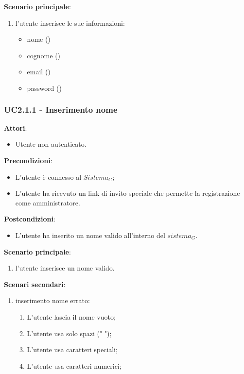 \textbf{Scenario principale}:
\begin{enumerate}
    \item l'utente inserisce le sue informazioni:
    \begin{itemize}
        \item nome ()
        \item cognome ()
        \item email ()
        \item password ()
    \end{itemize}
\end{enumerate}

\subsubsection{UC2.1.1 - Inserimento nome}\label{usecase:2_1_1}
\textbf{Attori}:
\begin{itemize}
    \item Utente non autenticato.
\end{itemize}
\textbf{Precondizioni}:
\begin{itemize}
   \item L'utente è connesso al $\textit{Sistema}_G$;
    \item L'utente ha ricevuto un link di invito speciale che permette la registrazione come amministratore.
\end{itemize}
\textbf{Postcondizioni}:
\begin{itemize}
    \item L'utente ha inserito un nome valido all'interno del $\textit{sistema}_G$.
\end{itemize}
\textbf{Scenario principale}:
\begin{enumerate}
    \item l'utente inserisce un nome valido.
\end{enumerate}
\textbf{Scenari secondari}:

\begin{enumerate}
    \item inserimento nome errato:
    \begin{enumerate}
        \item L'utente lascia il nome vuoto;
        \item L'utente usa solo spazi (" ");
        \item L'utente usa caratteri speciali;
        \item L'utente usa caratteri numerici;
    \end{enumerate}

\end{enumerate}


